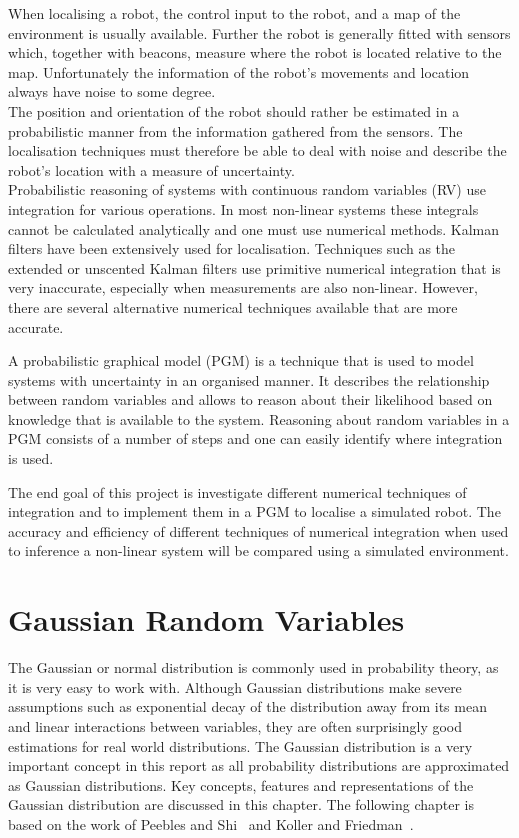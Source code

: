 \documentclass[12pt,oneside,openany,a4paper, %
afrikaans,english,
]{memoir}
\numberwithin{equation}{chapter}
\begin{document}
When localising a robot, the control input to the robot, and a map of the environment is usually available. Further the robot is generally fitted with sensors which, together with beacons, measure where the robot is located relative to the map. Unfortunately the information of the robot's movements and location always have noise to some degree.\\
The position and orientation of the robot should rather be estimated in a probabilistic manner from the information gathered from the sensors. The localisation techniques must therefore be able to deal with noise and describe the robot's location with a measure of uncertainty.\\
Probabilistic reasoning of systems with continuous random variables (RV) use integration for various operations. In most non-linear systems these integrals cannot be calculated analytically and one must use numerical methods. Kalman filters have been extensively used for localisation. Techniques such as the extended or unscented Kalman filters use primitive numerical integration that is very inaccurate, especially when measurements are also non-linear. However, there are several alternative numerical techniques available that are more accurate.

A probabilistic graphical model (PGM) is a technique that is used to model systems with uncertainty in an organised manner. It describes the relationship between random variables and allows to reason about their likelihood based on knowledge that is available to the system. Reasoning about random variables in a PGM consists of a number of steps and one can easily identify where integration is used.

The end goal of this project is investigate different numerical techniques of integration and to implement them in a PGM to localise a simulated robot. The accuracy and efficiency of different techniques of numerical integration when used to inference a non-linear system will be compared using a simulated environment.
\setcounter{secnumdepth}{2}
\chapter{Gaussian Random Variables}
The Gaussian or normal distribution is commonly used in probability theory, as it is very easy to work with. Although Gaussian distributions make severe assumptions such as exponential decay of the distribution away from its mean and linear interactions between variables, they are often surprisingly good estimations for real world distributions. The Gaussian distribution is a very important concept in this report as all probability distributions are approximated as Gaussian distributions. Key concepts, features and representations of the Gaussian distribution are discussed in this chapter. The following chapter is based on the work of Peebles and Shi~\cite{peebles} and Koller and Friedman~\cite{koller}.
\end{document}
